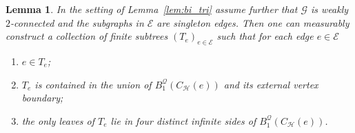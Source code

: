 \documentclass{article}
\theoremstyle{plain}
\newtheorem{lem}[thm]{Lemma}
\theoremstyle{definition}
\newcommand{\cG}{\mathcal{G}}
\newcommand{\cQ}{\mathcal{Q}}
\newcommand{\cE}{\mathcal{E}}
\newcommand{\cH}{\mathcal{H}}
\begin{document}
\begin{lem}\label{lem:trees_on_edges}
    In the setting of Lemma~\ref{lem:bi_tri} assume further that $\cG$ is weakly $2$-connected and the subgraphs in $\cE$ are singleton edges. Then one can measurably construct a collection of finite subtrees $(T_e)_{e \in \cE}$ such that for each edge $e\in \cE$ 
     \begin{enumerate}
         \item $e\in T_e$;
         \item $T_e$ is contained in the union of $B_1^{\cQ}(C_{\cH}(e))$ and its external vertex boundary;
         \item the only leaves of $T_e$ lie in four distinct infinite sides of $B_1^{\cQ}(C_{\cH}(e))$.
     \end{enumerate}
    \end{lem}
\end{document}
